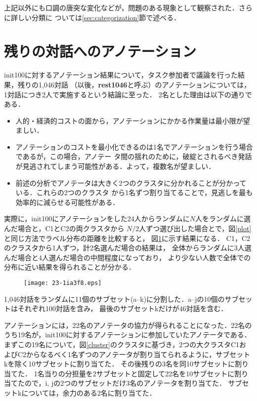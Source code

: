 \documentclass[japanese]{jnlp_1.4}
\begin{document}
\noindent 上記以外にも口調の唐突な変化などが，問題のある現象として観察された．さらに詳しい分類に
ついては\ref{sec:categorization}節で述べる．


\section{残りの対話へのアノテーション}
\label{sec:annotation2}

init100に対するアノテーション結果について，タスク参加者で議論を行った結果，残りの1,046対話
（以後，\textbf{rest1046}と呼ぶ）のアノテーションについては，1対話につき2人で実施するという結論に至った．
2名とした理由は以下の通りである．

\begin{itemize}
\item 人的・経済的コストの面から，アノテーションにかかる作業量は最小限が望ましい．
\item アノテーションのコストを最小化できるのは1名でアノテーションを行う場合であるが，この場合，アノテー
  タ間の揺れのために，破綻とされるべき発話が見逃されてしまう可能性がある．よって，複数名が望ましい．
\item 前述の分析でアノテータは大きく2つのクラスタに分かれることが分かっている．これらの2つのクラスタ
  から1名ずつ割り当てることで，見逃しを最も効率的に減らせる可能性がある．
\end{itemize}

実際に，init100にアノテーションをした24人からランダムに$N$人をランダムに選んだ場合と，C1とC2の両クラスタから
$N/2$人ずつ選び出した場合とで，図\ref{plot}と同じ方法でラベル分布の距離を比較すると，
図\ref{cluster_vs_random}に示す結果になる．
C1，C2のクラスタから1人ずつ，計2名選んだ場合の結果は，
全体からランダムに3人選んだ場合と4人選んだ場合の中間程度になっており，
より少ない人数で全体での分布に近い結果を得られることが分かる．

\begin{figure}[b]
\begin{center}
\texttt{[image: 23-1ia3f8.eps]}
\end{center}
\label{cluster_vs_random}
\end{figure}

1,046対話をランダムに11個のサブセット(a--k)に分割した．a--jの10個のサブセットはそれぞれ100対話を含み，
最後のサブセットkだけが46対話を含む．

アノテーションには，22名のアノテータの協力が得られることになった．22名のうち19名が，init100に対するアノテーションに参加していたアノテータである．
まずこの19名について，図\ref{cluster}のクラスタに基づき，2つの大クラスタC1およびC2からなるべく1名ずつのアノテータが割り当てられるように，サブセットkを除く10サブセットに割り当てた．
その後残りの3名を同10サブセットに割り当てた．
1名当りの分担量を2サブセットと固定して22名を10サブセットに割り当てたので，i, jの2つのサブセットだけ3名のアノテータを割り当てた．
サブセットkについては，余力のある2名に割り当てた．
\end{document}
